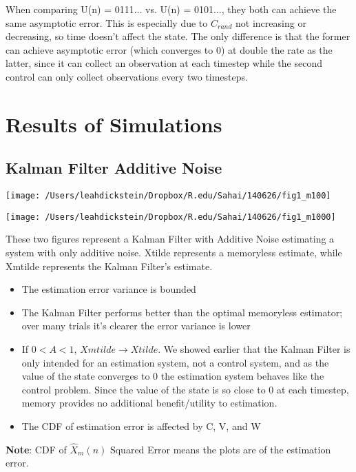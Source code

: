 \documentclass[leqno,twocolumn]{article}
\begin{document}
When comparing U(n) = 0111$\dots$ vs. U(n) = 0101$\dots$, they both can achieve the same asymptotic error. This is especially due to $C_{rand}$ not increasing or decreasing, so time doesn't affect the state. The only difference is that the former can achieve asymptotic error (which converges to 0) at double the rate as the latter, since it can collect an observation at each timestep while the second control can only collect observations every two timesteps.

\onecolumn
\section{Results of Simulations}
\subsection{Kalman Filter Additive Noise}
\begin{minipage}[c]{0.5\textwidth}
\texttt{[image: /Users/leahdickstein/Dropbox/R.edu/Sahai/140626/fig1\_m100]}
\end{minipage}
\begin{minipage}[c]{0.5\textwidth}
\texttt{[image: /Users/leahdickstein/Dropbox/R.edu/Sahai/140626/fig1\_m1000]}
\end{minipage}
These two figures represent a Kalman Filter with Additive Noise estimating a system with only additive noise. Xtilde represents a memoryless estimate, while Xmtilde represents the Kalman Filter's estimate.
\begin{itemize}
\item The estimation error variance is bounded
\item The Kalman Filter performs better than the optimal memoryless estimator; over many trials it's clearer the error variance is lower
\item If $0 < A < 1$, $Xmtilde \rightarrow Xtilde$. We showed earlier that the Kalman Filter is only intended for an estimation system, not a control system, and as the value of the state converges to 0 the estimation system behaves like the control problem. Since the value of the state is so close to 0 at each timestep, memory provides no additional benefit/utility to estimation.
\item The CDF of estimation error is affected by C, V, and W
\end{itemize}
\textbf{Note}: CDF of $\hat{X}_m(n)$ Squared Error means the plots are of the estimation error.
\end{document}
